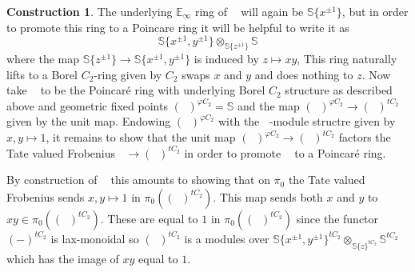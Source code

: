 \documentclass{article}
\DeclareMathOperator{\gmq}{\mathbb{G}_m^\Qoppa}
\renewcommand{\phi}{\varphi}
\theoremstyle{definition}
\newtheorem{construction}[equation]{Construction}
\begin{document}
\begin{construction}
	The underlying $\mathbb{E}_\infty$ ring of $\gmq$ will again be $\mathbb{S}\{x^{\pm 1}\}$, but in order to promote this ring to a Poincare ring it will be helpful to write it as \[\mathbb{S}\{x^{\pm 1}, y^{\pm 1}\}\otimes_{\mathbb{S}\{z^{\pm 1}\}}\mathbb{S}\] where the map $\mathbb{S}\{z^{\pm 1}\}\to \mathbb{S}\{x^{\pm 1}, y^{\pm 1}\}$ is induced by $z\mapsto xy$, This ring naturally lifts to a Borel $C_2$-ring given by $C_2$ swaps $x$ and $y$ and does nothing to $z$. Now take $\gmq$ to be the Poincar{\'e} ring with underlying Borel $C_2$ structure as described above and geometric fixed points $(\gmq)^{\phi C_2}=\mathbb{S}$ and the map $(\gmq)^{\phi C_2}\to (\gmq)^{tC_2}$ given by the unit map. Endowing $(\gmq)^{\phi C_2}$ with the $\gmq$-module structre given by $x,y\mapsto 1$, it remains to show that the unit map $(\gmq)^{\phi C_2}\to (\gmq)^{tC_2}$ factors the Tate valued Frobenius $\gmq\to (\gmq)^{tC_2}$ in order to promote $\gmq$ to a Poincar{\'e} ring.
	
	By construction of $\gmq$ this amounts to showing that on $\pi_0$ the Tate valued Frobenius sends $x,y\mapsto 1$ in $\pi_0((\gmq)^{tC_2})$. This map sends both $x$ and $y$ to $xy\in \pi_0((\gmq)^{tC_2})$. These are equal to $1$ in $\pi_0((\gmq)^{tC_2})$ since the functor $(-)^{tC_2}$ is lax-monoidal so $(\gmq)^{tC_2}$ is a modules over $\mathbb{S}\{x^{\pm 1}, y^{\pm 1}\}^{tC_2}\otimes_{\mathbb{S}\{z\}^{tC_2}}\mathbb{S}^{tC_2}$ which has the image of $xy$ equal to $1$.
\end{construction}
\end{document}
